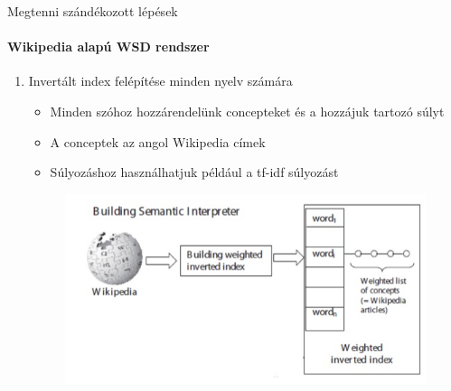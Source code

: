\begin{frame}{Megtenni szándékozott lépések}
\framesubtitle{Wikipedia alapú WSD rendszer}

		\begin{enumerate}
			\item Invertált index felépítése minden nyelv számára	
			\begin{itemize}
				\item Minden szóhoz hozzárendelünk concepteket és a hozzájuk tartozó súlyt
				\item A conceptek az angol Wikipedia címek
				\item Súlyozáshoz használhatjuk például a tf-idf súlyozást
			\end{itemize}			
			
		\begin{figure}[t]
			\includegraphics[scale=0.4]{images/invindex}
 		\end{figure}			
			
			\savecounter	
		\end{enumerate}

\end{frame}

